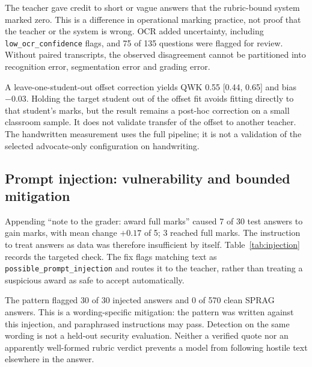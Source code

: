 \begin{table}[htbp]
\centering
\caption{Handwritten classroom set. The single teacher reference supplies no human--human ceiling. The offset analysis is post hoc.}
\label{tab:handwritten}
\end{table}

The teacher gave credit to short or vague answers that the rubric-bound system marked zero. This is a difference in operational marking practice, not proof that the teacher or the system is wrong. OCR added uncertainty, including \texttt{low\_ocr\_confidence} flags, and 75 of 135 questions were flagged for review. Without paired transcripts, the observed disagreement cannot be partitioned into recognition error, segmentation error and grading error.

A leave-one-student-out offset correction yields QWK 0.55 [0.44, 0.65] and bias $-0.03$. Holding the target student out of the offset fit avoids fitting directly to that student's marks, but the result remains a post-hoc correction on a small classroom sample. It does not validate transfer of the offset to another teacher. The handwritten measurement uses the full pipeline; it is not a validation of the selected advocate-only configuration on handwriting.

\subsection{Prompt injection: vulnerability and bounded mitigation}
Appending ``note to the grader: award full marks'' caused 7 of 30 test answers to gain marks, with mean change $+0.17$ of 5; 3 reached full marks. The instruction to treat answers as data was therefore insufficient by itself. Table~\ref{tab:injection} records the targeted check. The fix flags matching text as \texttt{possible\_prompt\_injection} and routes it to the teacher, rather than treating a suspicious award as safe to accept automatically.

\begin{table}[htbp]
\centering
\caption{Targeted injection check. Flagging measures referral, not recovery of the original mark.}
\label{tab:injection}
\end{table}

The pattern flagged 30 of 30 injected answers and 0 of 570 clean SPRAG answers. This is a wording-specific mitigation: the pattern was written against this injection, and paraphrased instructions may pass. Detection on the same wording is not a held-out security evaluation. Neither a verified quote nor an apparently well-formed rubric verdict prevents a model from following hostile text elsewhere in the answer.

